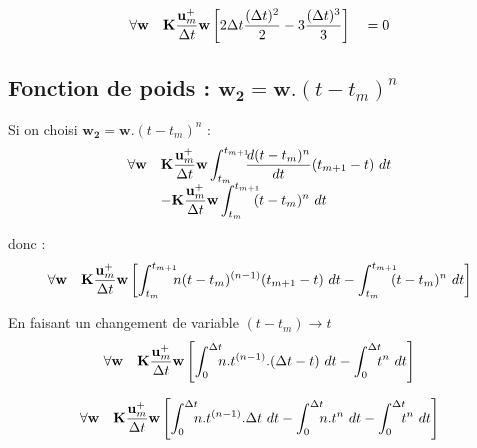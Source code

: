 \documentclass[12pt,a4paper]{report}
\begin{document}
\begin{equation}
\begin{array}{r l}
	\forall \mathbf{w}
	&\displaystyle
	 \mathbf{K} \frac{\mathbf{u}_m^+}{\Delta t} \mathbf{w}
	 	\left[
	 	  2\Delta t \frac{(\Delta t)^2}{2} 
	 	 -3 \frac{(\Delta t)^3}{3}
	 	\right]
	 	~~~ = 0
\end{array}
\end{equation}

\subsection{Fonction de poids : $ \mathbf{w_2} = \mathbf{w}.(t-t_m)^n$}
Si on choisi $ \mathbf{w_2} = \mathbf{w}.(t-t_m)^n$ :
\begin{equation}
\begin{array}{r l}
	\forall \mathbf{w}
	&\displaystyle
	 \mathbf{K} \frac{\mathbf{u}_m^+}{\Delta t} \mathbf{w} 
	 	\int_{t_m}^{t_{m+1}} \!\!\! \frac{d(t-t_m)^n}{dt}		
			(t_{m+1}-t) ~dt
	\\
	  &\displaystyle	
	   - \mathbf{K} \frac{ \mathbf{u}_m^+ }{\Delta t} \mathbf{w}
	   		\int_{t_m}^{t_{m+1}} \!\!\!  (t-t_m)^n 	~dt 
\end{array}
\end{equation}

donc :
\begin{equation}
\begin{array}{r l}
	\forall \mathbf{w}
	&\displaystyle
	 \mathbf{K} \frac{\mathbf{u}_m^+}{\Delta t} \mathbf{w}
	 	\left[
	 	  \int_{t_m}^{t_{m+1}} \!\!\! n( t - t_m)^{(n-1)}(t_{m+1}-t) ~dt
	 	 -\int_{t_m}^{t_{m+1}} \!\!\!  (t-t_m)^n 	~dt 
	 	\right]
\end{array}
\end{equation}

En faisant un changement de variable $(t-t_m) \rightarrow t$
\begin{equation}
\begin{array}{r l}
	\forall \mathbf{w}
	&\displaystyle
	 \mathbf{K} \frac{\mathbf{u}_m^+}{\Delta t} \mathbf{w}
	 	\left[
	 	  \int_{0}^{\Delta t} \!\!\! n.t^{(n-1)}.(\Delta t-t) ~dt
	 	 -\int_{0}^{\Delta t} \!\!\!  t^n 	~dt 
	 	\right]
\end{array}
\end{equation}

\begin{equation}
\begin{array}{r l}
	\forall \mathbf{w}
	&\displaystyle
	 \mathbf{K} \frac{\mathbf{u}_m^+}{\Delta t} \mathbf{w}
	 	\left[
	 	  \int_{0}^{\Delta t} \!\!\! n.t^{(n-1)}.\Delta t ~dt
	 	 -\int_{0}^{\Delta t} \!\!\! n.t^n ~dt
	 	 -\int_{0}^{\Delta t} \!\!\!  t^n 	~dt 
	 	\right]
\end{array}
\end{equation}
\end{document}
